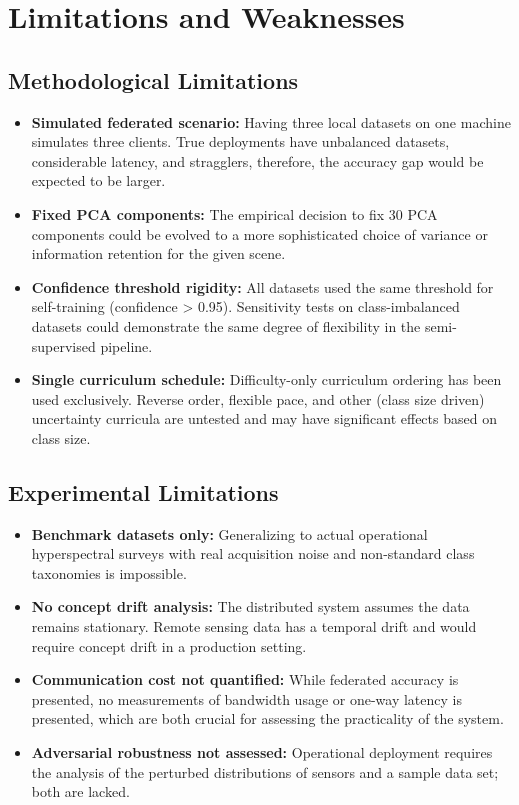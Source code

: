 \section{Limitations and Weaknesses}

\subsection{Methodological Limitations}
\begin{itemize}
    \item \textbf{Simulated federated scenario:} Having three local datasets on one machine simulates three clients. True deployments have unbalanced datasets, considerable latency, and stragglers, therefore, the accuracy gap would be expected to be larger.

    \item \textbf{Fixed PCA components:} The empirical decision to fix 30 PCA components could be evolved to a more sophisticated choice of variance or information retention for the given scene.

    \item \textbf{Confidence threshold rigidity:} All datasets used the same threshold for self-training (confidence > 0.95). Sensitivity tests on class-imbalanced datasets could demonstrate the same degree of flexibility in the semi-supervised pipeline.

    \item \textbf{Single curriculum schedule:} Difficulty-only curriculum ordering has been used exclusively. Reverse order, flexible pace, and other (class size driven) uncertainty curricula are untested and may have significant effects based on class size.
\end{itemize}

\subsection{Experimental Limitations}
\begin{itemize}
    \item \textbf{Benchmark datasets only:} Generalizing to actual operational hyperspectral surveys with real acquisition noise and non-standard class taxonomies is impossible.

    \item \textbf{No concept drift analysis:} The distributed system assumes the data remains stationary. Remote sensing data has a temporal drift and would require concept drift in a production setting.

    \item \textbf{Communication cost not quantified:} While federated accuracy is presented, no measurements of bandwidth usage or one-way latency is presented, which are both crucial for assessing the practicality of the system.

    \item \textbf{Adversarial robustness not assessed:} Operational deployment requires the analysis of the perturbed distributions of sensors and a sample data set; both are lacked.
\end{itemize}

